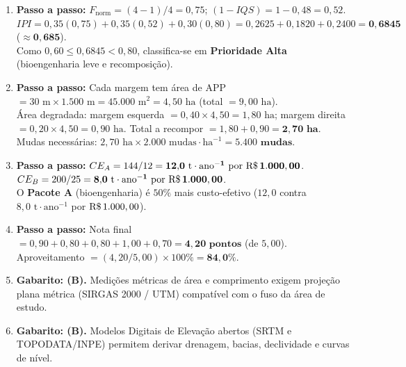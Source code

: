 \begin{boxGabarito}
\begin{enumerate}[leftmargin=1.6em, itemsep=4pt]
  Para $1:15.000$: $A_{\min} = 4 \times 10^{-6} \times (15.000)^2 = 4 \times 10^{-6} \times 2{,}25 \times 10^8 = \mathbf{900\text{ m}^2 = 0{,}09\text{ ha}}$. \\
  Para $1:50.000$: $A_{\min} = 4 \times 10^{-6} \times (50.000)^2 = 4 \times 10^{-6} \times 2{,}5 \times 10^9 = \mathbf{10.000\text{ m}^2 = 1{,}00\text{ ha}}$.
  \item \textbf{Passo a passo:}
  $F_{\text{norm}} = (4 - 1)/4 = 0{,}75$; $(1 - IQS) = 1 - 0{,}48 = 0{,}52$. \\
  $IPI = 0{,}35(0{,}75) + 0{,}35(0{,}52) + 0{,}30(0{,}80) = 0{,}2625 + 0{,}1820 + 0{,}2400 = \mathbf{0{,}6845}$ ($\approx \mathbf{0{,}685}$). \\
  Como $0{,}60 \le 0{,}6845 < 0{,}80$, classifica-se em \textbf{Prioridade Alta} (bioengenharia leve e recomposição).
  \item \textbf{Passo a passo:}
  Cada margem tem área de APP $= 30\text{ m} \times 1.500\text{ m} = 45.000\text{ m}^2 = 4{,}50\text{ ha}$ (total $= 9{,}00\text{ ha}$). \\
  Área degradada: margem esquerda $= 0{,}40 \times 4{,}50 = 1{,}80\text{ ha}$; margem direita $= 0{,}20 \times 4{,}50 = 0{,}90\text{ ha}$. Total a recompor $= 1{,}80 + 0{,}90 = \mathbf{2{,}70\text{ ha}}$. \\
  Mudas necessárias: $2{,}70\text{ ha} \times 2.000\text{ mudas}\cdot\text{ha}^{-1} = \mathbf{5.400\text{ mudas}}$.
  \item \textbf{Passo a passo:}
  $CE_A = 144 / 12 = \mathbf{12{,}0\text{ t}\cdot\text{ano}^{-1}\text{ por }\text{R\$\,}{1.000,00}}$. \\
  $CE_B = 200 / 25 = \mathbf{8{,}0\text{ t}\cdot\text{ano}^{-1}\text{ por }\text{R\$\,}{1.000,00}}$. \\
  O \textbf{Pacote A} (bioengenharia) é $50\%$ mais custo-efetivo ($12{,}0$ contra $8{,}0\text{ t}\cdot\text{ano}^{-1}$ por $\text{R\$\,}{1.000,00}$).
  \item \textbf{Passo a passo:}
  Nota final $= 0{,}90 + 0{,}80 + 0{,}80 + 1{,}00 + 0{,}70 = \mathbf{4{,}20\text{ pontos}}$ (de $5{,}00$). \\
  Aproveitamento $= (4{,}20 / 5{,}00) \times 100\% = \mathbf{84{,}0\%}$.
  \item \textbf{Gabarito: (B).} Medições métricas de área e comprimento exigem projeção plana métrica (SIRGAS 2000 / UTM) compatível com o fuso da área de estudo.
  \item \textbf{Gabarito: (B).} Modelos Digitais de Elevação abertos (SRTM e TOPODATA/INPE) permitem derivar drenagem, bacias, declividade e curvas de nível.

\end{enumerate}
\end{boxGabarito}
